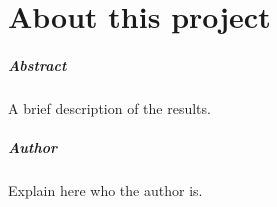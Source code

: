 
\chapter*{About this project}
\paragraph{Abstract}
A brief description of the results.

\paragraph{Author}
Explain here who the author is.